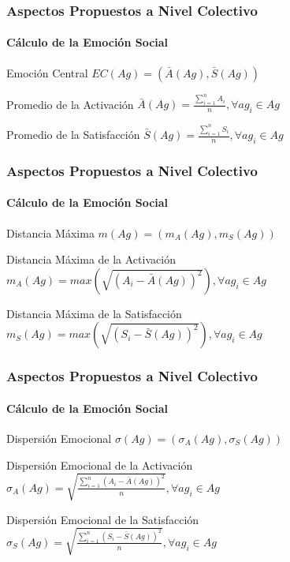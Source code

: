 \documentclass{beamer}
\begin{document}
\begin{frame}
\frametitle{Aspectos Propuestos a Nivel Colectivo}
\framesubtitle{Cálculo de la Emoción Social}
\begin{exampleblock}{Emoción Central}
$EC(Ag) = (\bar A(Ag), \bar S(Ag))$
\end{exampleblock}

\begin{exampleblock}{Promedio de la Activación}
$\bar A(Ag)=\frac{\sum_{i=1}^n A_i}{n}, \forall ag_i \in Ag$ \\
\end{exampleblock}

\begin{exampleblock}{Promedio de la Satisfacción}
$\bar S(Ag)=\frac{\sum_{i=1}^n S_i}{n}, \forall ag_i \in Ag$
\end{exampleblock}

\end{frame}

\begin{frame}
\frametitle{Aspectos Propuestos a Nivel Colectivo}
\framesubtitle{Cálculo de la Emoción Social}
\begin{exampleblock}{Distancia Máxima}
$ m(Ag) = (m_A(Ag), m_S(Ag))$
\end{exampleblock}

\begin{exampleblock}{Distancia Máxima de la Activación}
$m_A(Ag) = max\left(\sqrt{(A_i - \bar A(Ag))^2}\right), \forall ag_i \in Ag$
\end{exampleblock}

\begin{exampleblock}{Distancia Máxima de la Satisfacción}
$m_S(Ag) = max\left(\sqrt{(S_i - \bar S(Ag))^2}\right), \forall ag_i \in Ag$
\end{exampleblock}

\end{frame}

\begin{frame}
\frametitle{Aspectos Propuestos a Nivel Colectivo}
\framesubtitle{Cálculo de la Emoción Social}
\begin{exampleblock}{Dispersión Emocional}
$ \sigma(Ag) = (\sigma_A(Ag), \sigma_S(Ag))$
\end{exampleblock}

\begin{exampleblock}{Dispersión Emocional de la Activación}
$\sigma_A(Ag) = \sqrt{\frac{\sum_{i=1}^n(A_i - \bar A(Ag))^2}{n}},  \forall ag_i \in Ag$
\end{exampleblock}

\begin{exampleblock}{Dispersión Emocional de la Satisfacción}
$  \sigma_S(Ag) = \sqrt{\frac{\sum_{i=1}^n(S_i - \bar S(Ag))^2}{n}},  \forall ag_i \in Ag$
\end{exampleblock}
\end{frame}
\end{document}
